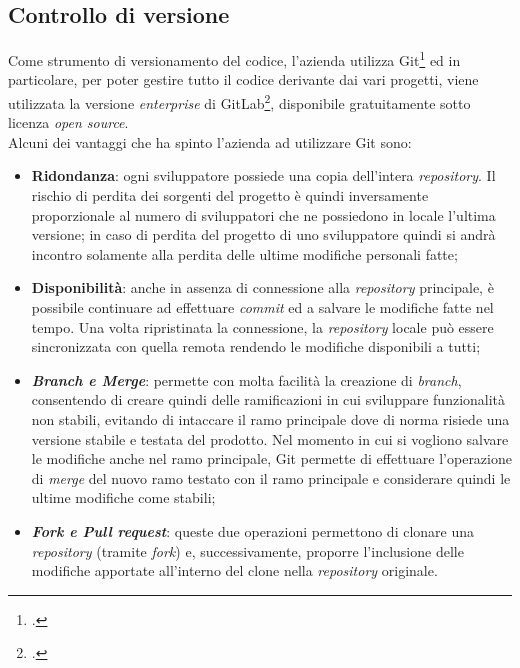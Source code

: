 \subsection{Controllo di versione}
Come strumento di versionamento del codice, l’azienda utilizza \gls{Git}\footcite{https://git-scm.com/} ed in particolare, per poter gestire tutto il codice derivante dai vari progetti, viene utilizzata la versione \textit{enterprise} di \gls{GitLab}\footcite{https://about.gitlab.com/}, disponibile gratuitamente sotto licenza \textit{open source}.\\
Alcuni dei vantaggi che ha spinto l’azienda ad utilizzare Git sono:
\begin{itemize}
	\item \textbf{Ridondanza}: ogni sviluppatore possiede una copia dell’intera \textit{repository}. Il rischio di perdita dei sorgenti del progetto è quindi inversamente proporzionale al numero di sviluppatori che ne possiedono in locale l’ultima versione; in caso di perdita del progetto di uno sviluppatore quindi si andrà incontro solamente alla perdita delle ultime modifiche personali fatte;
	\item \textbf{Disponibilità}: anche in assenza di connessione alla \textit{repository} principale, è possibile continuare ad effettuare \textit{commit} ed a salvare le modifiche fatte nel tempo. Una volta ripristinata la connessione, la \textit{repository} locale può essere sincronizzata con quella remota rendendo le modifiche disponibili a tutti;
	\item \textit{\textbf{Branch e Merge}}: permette con molta facilità la creazione di \textit{branch}, consentendo di creare quindi delle ramificazioni in cui sviluppare funzionalità non stabili, evitando di intaccare il ramo principale dove di norma risiede una versione stabile e testata del prodotto. Nel momento in cui si vogliono salvare le modifiche anche nel ramo principale, \gls{Git} permette di effettuare l’operazione di \textit{merge} del nuovo ramo testato con il ramo principale e considerare quindi le ultime modifiche come stabili;
	\item \textit{\textbf{Fork e Pull request}}: queste due operazioni permettono di clonare una \textit{repository} (tramite \textit{fork}) e, successivamente, proporre l’inclusione delle modifiche apportate all’interno del clone nella \textit{repository} originale.
\end{itemize}


